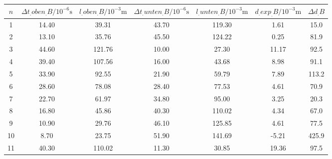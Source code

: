 \label{tab:tabBScan}
	\begin{tabular}{S[table-format=1.0]S[table-format=2.2]S[table-format=2.2]S[table-format=2.2]S[table-format=2.2]S[table-format=2.2]S[table-format=2.1]}
		\toprule
		{$n$} & {$\Delta t_.{oben_.{B} }/10^{-6}\si{\second}$} & {$l_.{oben_.{B}}/10^{-3}\si{\metre}$} & {$\Delta t_.{unten_.{B}}/10^{-6}\si{\second}$} & {$l_.{unten_.{B}}/10^{-3}\si{\metre}$} & {$d_.{exp_.{B}}/10^{-3}\si{\metre}$} &{$\Delta d_.B$} \\
		 & 14.40 & 39.31 & 43.70 & 119.30 & 1.61 & 15.0 \\
		2 & 13.10 & 35.76 & 45.50 & 124.22 & 0.25 & 81.9 \\
		3 & 44.60 & 121.76 & 10.00 & 27.30 & 11.17 & 92.5 \\
		4 & 39.40 & 107.56 & 16.00 & 43.68 & 8.98 & 91.1 \\
		5 & 33.90 & 92.55 & 21.90 & 59.79 & 7.89 & 113.2 \\
		6 & 28.60 & 78.08 & 28.40 & 77.53 & 4.61 & 70.9 \\
		7 & 22.70 & 61.97 & 34.80 & 95.00 & 3.25 & 20.3 \\
		8 & 16.80 & 45.86 & 40.30 & 110.02 & 4.34 & 67.0 \\
		9 & 10.90 & 29.76 & 46.10 & 125.85 & 4.61 & 77.5 \\
		10 & 8.70 & 23.75 & 51.90 & 141.69 & -5.21 & 425.9 \\
		11 & 40.30 & 110.02 & 11.30 & 30.85 & 19.36 & 97.5 \\
		\bottomrule
	\end{tabular}
